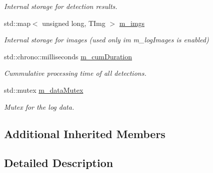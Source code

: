 \begin{DoxyCompactItemize}
\begin{DoxyCompactList}\small\item\em Internal storage for detection results. \end{DoxyCompactList}\item 
\hypertarget{class_vision_core_1_1_abstractions_1_1_detector_logger_aebfc182cead05fb2cb6d30ffd33eabd3}{}std\+::map$<$ unsigned long, T\+Img $>$ \hyperlink{class_vision_core_1_1_abstractions_1_1_detector_logger_aebfc182cead05fb2cb6d30ffd33eabd3}{m\+\_\+imgs}\label{class_vision_core_1_1_abstractions_1_1_detector_logger_aebfc182cead05fb2cb6d30ffd33eabd3}

\begin{DoxyCompactList}\small\item\em Internal storage for images (used only im m\+\_\+log\+Images is enabled) \end{DoxyCompactList}\item 
\hypertarget{class_vision_core_1_1_abstractions_1_1_detector_logger_a0b3be8372825e4a3e7fe9d04aafd923e}{}std\+::chrono\+::milliseconds \hyperlink{class_vision_core_1_1_abstractions_1_1_detector_logger_a0b3be8372825e4a3e7fe9d04aafd923e}{m\+\_\+cum\+Duration}\label{class_vision_core_1_1_abstractions_1_1_detector_logger_a0b3be8372825e4a3e7fe9d04aafd923e}

\begin{DoxyCompactList}\small\item\em Cummulative processing time of all detections. \end{DoxyCompactList}\item 
\hypertarget{class_vision_core_1_1_abstractions_1_1_detector_logger_a864bbc1c90b2c0599463d65224c10e01}{}std\+::mutex \hyperlink{class_vision_core_1_1_abstractions_1_1_detector_logger_a864bbc1c90b2c0599463d65224c10e01}{m\+\_\+data\+Mutex}\label{class_vision_core_1_1_abstractions_1_1_detector_logger_a864bbc1c90b2c0599463d65224c10e01}

\begin{DoxyCompactList}\small\item\em Mutex for the log data. \end{DoxyCompactList}\end{DoxyCompactItemize}
\subsection*{Additional Inherited Members}


\subsection{Detailed Description}
